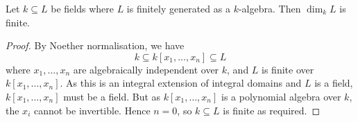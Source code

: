 \begin{proposition}
    Let \( k \subseteq L \) be fields where \( L \) is finitely generated as a \( k \)-algebra.
    Then \( \dim_k L \) is finite.
\end{proposition}
\begin{proof}
    By Noether normalisation, we have
    \[ k \subseteq k[x_1, \dots, x_n] \subseteq L \]
    where \( x_1, \dots, x_n \) are algebraically independent over \( k \), and \( L \) is finite over \( k[x_1, \dots, x_n] \).
    As this is an integral extension of integral domains and \( L \) is a field, \( k[x_1, \dots, x_n] \) must be a field.
    But as \( k[x_1, \dots, x_n] \) is a polynomial algebra over \( k \), the \( x_i \) cannot be invertible.
    Hence \( n = 0 \), so \( k \subseteq L \) is finite as required.
\end{proof}
